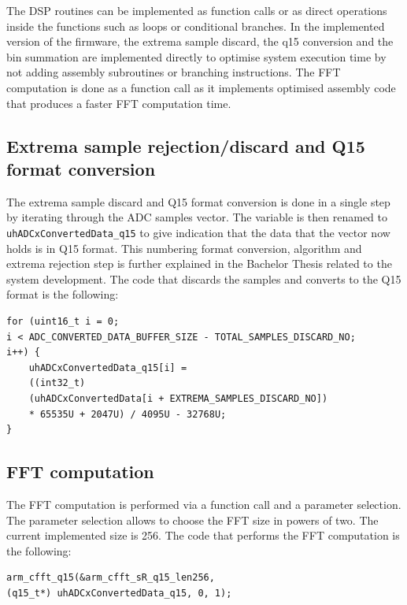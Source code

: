 The DSP routines can be implemented as function calls or as direct operations inside the functions such as loops or conditional branches. In the implemented version of the firmware, the extrema sample discard, the q15 conversion and the bin summation are implemented directly to optimise system execution time by not adding assembly subroutines or branching instructions. The FFT computation is done as a function call as it implements optimised assembly code that produces a faster FFT computation time.

\subsection{Extrema sample rejection/discard and Q15 format conversion}

The extrema sample discard and Q15 format conversion is done in a single step by iterating through the ADC samples vector. The variable is then renamed to \texttt{uhADCxConvertedData\_q15} to give indication that the data that the vector now holds is in Q15 format. This numbering format conversion, algorithm and extrema rejection step is further explained in the Bachelor Thesis related to the system development. The code that discards the samples and converts to the Q15 format is the following:

\begin{verbatim}
for (uint16_t i = 0;
i < ADC_CONVERTED_DATA_BUFFER_SIZE - TOTAL_SAMPLES_DISCARD_NO;
i++) {
	uhADCxConvertedData_q15[i] =
	((int32_t)
	(uhADCxConvertedData[i + EXTREMA_SAMPLES_DISCARD_NO])
	* 65535U + 2047U) / 4095U - 32768U;
}
\end{verbatim}

\subsection{FFT computation}

The FFT computation is performed via a function call and a parameter selection. The parameter selection allows to choose the FFT size in powers of two. The current implemented size is 256. The code that performs the FFT computation is the following:

\begin{verbatim}
arm_cfft_q15(&arm_cfft_sR_q15_len256,
(q15_t*) uhADCxConvertedData_q15, 0, 1);
\end{verbatim}

